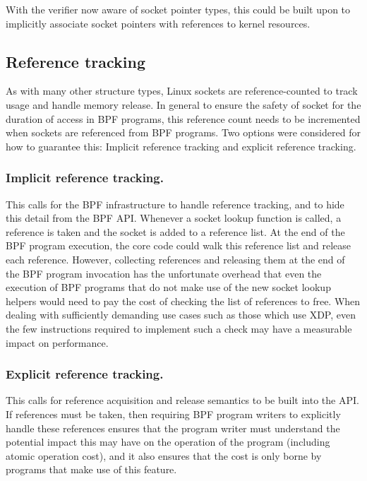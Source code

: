 \documentclass[10pt,sigconf,authorversion]{lpc}
\begin{document}
With the verifier now aware of socket pointer types, this could be built upon
to implicitly associate socket pointers with references to kernel resources.

\subsection{Reference tracking}

As with many other structure types, Linux sockets are reference-counted to
track usage and handle memory release. In general to ensure the safety of
socket for the duration of access in BPF programs, this reference count needs
to be incremented when sockets are referenced from BPF programs. Two options
were considered for how to guarantee this: Implicit reference tracking and
explicit reference tracking.

\subsubsection{Implicit reference tracking.}

This calls for the BPF infrastructure to handle reference tracking, and to hide
this detail from the BPF API. Whenever a socket lookup function is called, a
reference is taken and the socket is added to a reference list. At the end of
the BPF program execution, the core code could walk this reference list and
release each reference. However, collecting references and releasing them at
the end of the BPF program invocation has the unfortunate overhead that even
the execution of BPF programs that do not make use of the new socket lookup
helpers would need to pay the cost of checking the list of references to free.
When dealing with sufficiently demanding use cases such as those which use XDP,
even the few instructions required to implement such a check may have a
measurable impact on performance.

\subsubsection{Explicit reference tracking.}

This calls for reference acquisition and release semantics to be built into the
API. If references must be taken, then requiring BPF program writers to
explicitly handle these references ensures that the program writer must
understand the potential impact this may have on the operation of the program
(including atomic operation cost), and it also ensures that the cost is only
borne by programs that make use of this feature.
\end{document}
